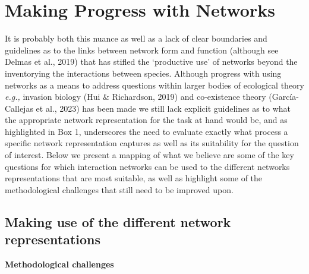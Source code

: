 \documentclass[
]{article}
\begin{document}
\section{Making Progress with Networks}\label{sec-progress}

It is probably both this nuance as well as a lack of clear boundaries
and guidelines as to the links between network form and function
(although see Delmas et al., 2019) that has stifled the `productive use'
of networks beyond the inventorying the interactions between species.
Although progress with using networks as a means to address questions
within larger bodies of ecological theory \emph{e.g.,} invasion biology
(Hui \& Richardson, 2019) and co-existence theory (García-Callejas et
al., 2023) has been made we still lack explicit guidelines as to what
the appropriate network representation for the task at hand would be,
and as highlighted in Box 1, underscores the need to evaluate exactly
what process a specific network representation captures as well as its
suitability for the question of interest. Below we present a mapping of
what we believe are some of the key questions for which interaction
networks can be used to the different networks representations that are
most suitable, as well as highlight some of the methodological
challenges that still need to be improved upon.

\subsection{Making use of the different network
representations}\label{making-use-of-the-different-network-representations}

\textbf{Methodological challenges}
\end{document}
